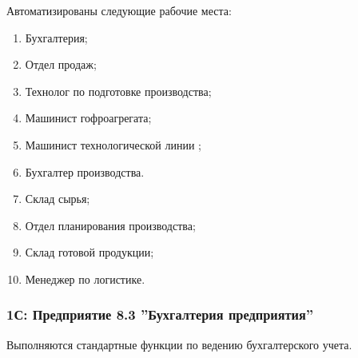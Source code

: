%

Автоматизированы следующие рабочие места:
\begin{enumerate}
\item Бухгалтерия;
\item Отдел продаж;
\item Технолог по подготовке производства;
\item Машинист гофроагрегата;
\item Машинист технологической линии ;
\item Бухгалтер производства.
\item Склад сырья;
\item Отдел планирования производства;
\item Склад готовой продукции;
\item Менеджер по логистике.
\end{enumerate}





\subsubsection{1С: Предприятие 8.3 ''Бухгалтерия предприятия''}

Выполняются стандартные функции по ведению бухгалтерского учета.

